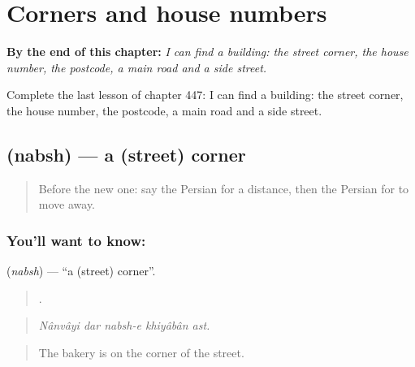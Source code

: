 
\chapter{Corners and house numbers}
\label{ch:fa-corners-and-house-numbers}

\begin{chapteropening}
\textbf{By the end of this chapter:} \emph{I can find a building: the street corner, the house number, the postcode, a main road and a side street.}

Complete the last lesson of chapter 447: I can find a building: the street corner, the house number, the postcode, a main road and a side street.
\end{chapteropening}

\section[\texorpdfstring{\fa{نبش} (nabsh)}{نبش (nabsh)}]{ (nabsh) — a (street) corner}

\label{lesson:FA-C447-nabsh}



\begin{quote}
Before the new one: say the Persian for a distance, then the Persian for to move away.
\end{quote}

\subsection*{You'll want to know: }
\textbf{} (\emph{nabsh}) — \textquotedblleft{}a (street) corner\textquotedblright{}.

\begin{quote}
    .
\end{quote}

\begin{quote}
\emph{Nânvâyi dar nabsh-e khiyâbân ast.}
\end{quote}

\begin{quote}
The bakery is on the corner of the street.
\end{quote}

